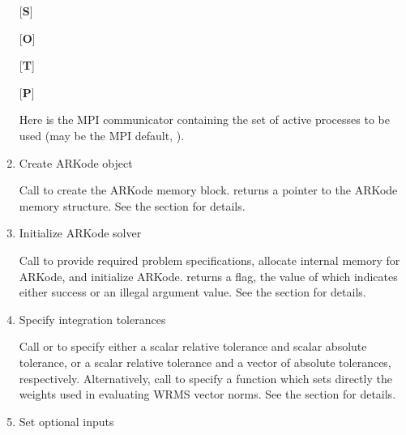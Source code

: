 \documentclass[letterpaper,10pt,english]{sphinxmanual}
\begin{document}
\begin{enumerate}
{[}\textbf{S}{]} 

{[}\textbf{O}{]} 

{[}\textbf{T}{]} 

{[}\textbf{P}{]} 

Here  is the MPI communicator containing the set of active
processes to be used (may be the MPI default, ).

\item {} 
Create ARKode object

Call  to create the ARKode memory
block. {\hyperref[c_interface/User_callable:c.ARKodeCreate]{\emph{}}} returns a pointer to the ARKode memory
structure. See the section {\hyperref[c_interface/User_callable:cinterface-initialization]{\emph{}}} for
details.

\item {} 
Initialize ARKode solver

Call {\hyperref[c_interface/User_callable:c.ARKodeInit]{\emph{}}} to provide required problem specifications,
allocate internal memory for ARKode, and initialize
ARKode. {\hyperref[c_interface/User_callable:c.ARKodeInit]{\emph{}}} returns a flag, the value of which indicates
either success or an illegal argument value. See the section
{\hyperref[c_interface/User_callable:cinterface-initialization]{\emph{}}} for details.

\item {} 
Specify integration tolerances

Call {\hyperref[c_interface/User_callable:c.ARKodeSStolerances]{\emph{}}} or {\hyperref[c_interface/User_callable:c.ARKodeSVtolerances]{\emph{}}} to
specify either a scalar relative tolerance and scalar absolute
tolerance, or a scalar relative tolerance and a vector of absolute
tolerances, respectively. Alternatively, call {\hyperref[c_interface/User_callable:c.ARKodeWFtolerances]{\emph{}}}
to specify a function which sets directly the weights used in
evaluating WRMS vector norms. See the section
{\hyperref[c_interface/User_callable:cinterface-tolerances]{\emph{}}} for details.

\item {} 
Set optional inputs


\end{enumerate}
\end{document}
